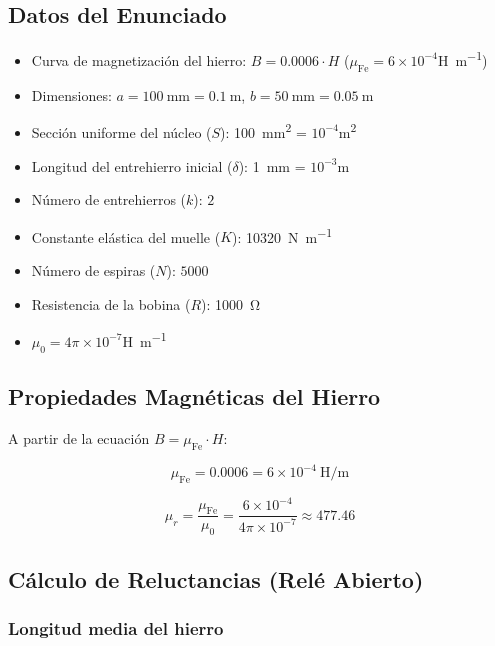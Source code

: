 \documentclass[12pt,a4paper]{article}
\begin{document}
\subsection{Datos del Enunciado}

\begin{itemize}[nosep]
    \item Curva de magnetización del hierro: $B = 0.0006 \cdot H$ ($\mu_{\text{Fe}} = 6 \times 10^{-4}$\si{\henry\per\meter})
    \item Dimensiones: $a = \SI{100}{\mm} = \SI{0.1}{\m}$, $b = \SI{50}{\mm} = \SI{0.05}{\m}$
    \item Sección uniforme del núcleo ($S$): \SI{100}{\square\mm} = $10^{-4}$\si{\square\meter}
    \item Longitud del entrehierro inicial ($\delta$): \SI{1}{\mm} = $10^{-3}$\si{\meter}
    \item Número de entrehierros ($k$): $2$
    \item Constante elástica del muelle ($K$): \SI{10320}{\newton\per\meter}
    \item Número de espiras ($N$): $5000$
    \item Resistencia de la bobina ($R$): \SI{1000}{\ohm}
    \item $\mu_0 = 4\pi \times 10^{-7}$\si{\henry\per\meter}
\end{itemize}

\subsection{Propiedades Magnéticas del Hierro}

A partir de la ecuación $B = \mu_{\text{Fe}} \cdot H$:

\begin{equation}
    \mu_{\text{Fe}} = 0.0006 = 6 \times 10^{-4}\ \si{\henry\per\meter}
\end{equation}

\begin{equation}
    \mu_r = \frac{\mu_{\text{Fe}}}{\mu_0}
    = \frac{6 \times 10^{-4}}{4\pi \times 10^{-7}} \approx 477.46
\end{equation}

\subsection{Cálculo de Reluctancias (Relé Abierto)}

\subsubsection*{Longitud media del hierro}
\end{document}
